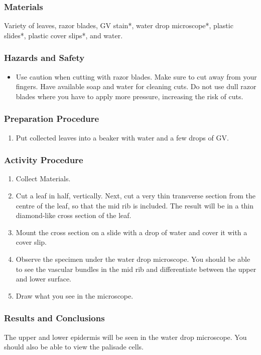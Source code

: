 \subsubsection*{Materials}
Variety of leaves, razor blades, GV stain*, water drop microscope*, plastic slides*, plastic cover slips*, and water.

\subsubsection*{Hazards and Safety}
\begin{itemize}
\item{Use caution when cutting with razor blades. Make sure to cut away from your fingers. Have available soap and water for cleaning cuts. Do not use dull razor blades where you have to apply more pressure, increasing the risk of cuts.}
\end{itemize}

\subsubsection*{Preparation Procedure}
\begin{enumerate}
\item{Put collected leaves into a beaker with water and a few drops of GV.}
\end{enumerate}

\subsubsection*{Activity Procedure}
\begin{enumerate}
\item{Collect Materials.}
\item{Cut a leaf in half, vertically. Next, cut a very thin transverse section from the centre of the leaf, so that the mid rib is included. The result will be in a thin diamond-like cross section of the leaf.}
\item{Mount the cross section on a slide with a drop of water and cover it with a cover slip.}
\item{Observe the specimen under the water drop microscope. You should be able to see the vascular bundles in the mid rib and differentiate between the upper and lower surface.}
\item{Draw what you see in the microscope.}
\end{enumerate}

\subsubsection*{Results and Conclusions}
The upper and lower epidermis will be seen in the water drop microscope. You should also be able to view the palisade cells.

